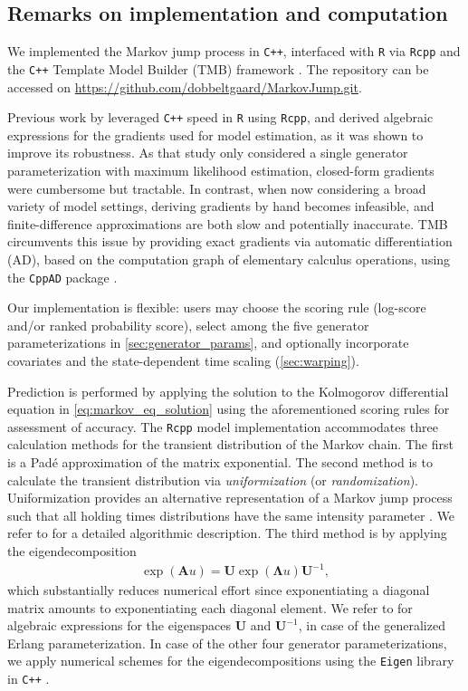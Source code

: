 \subsection{Remarks on implementation and computation} \label{sec:computation_remarks}
We implemented the Markov jump process in \texttt{C++}, interfaced with \texttt{R} via \texttt{Rcpp} \citep{Rcpp} and the \texttt{C++} Template Model Builder (TMB) framework \citep{TMB}.
The repository can be accessed on \url{https://github.com/dobbeltgaard/MarkovJump.git}.
 
Previous work by \citet{bisgaard2024A} leveraged \texttt{C++} speed in \texttt{R} using \texttt{Rcpp}, and derived algebraic expressions for the gradients used for model estimation, as it was shown to improve its robustness. 
As that study only considered a single generator parameterization with maximum likelihood estimation, closed-form gradients were cumbersome but tractable.
In contrast, when now considering a broad variety of model settings, deriving gradients by hand becomes infeasible, and finite-difference approximations are both slow and potentially inaccurate. TMB circumvents this issue by providing exact gradients via automatic differentiation (AD), based on the computation graph of elementary calculus operations, using the \texttt{CppAD} package \citep{CppAD}.

Our implementation is flexible: users may choose the scoring rule (log-score and/or ranked probability score), select among the five generator parameterizations in \cref{sec:generator_params}, and optionally incorporate covariates and the state-dependent time scaling (\cref{sec:warping}).
 
Prediction is performed by applying the solution to the Kolmogorov differential equation in \cref{eq:markov_eq_solution} using the aforementioned scoring rules for assessment of accuracy.
The \texttt{Rcpp} model implementation accommodates three calculation methods for the transient distribution of the Markov chain. The first is a Padé approximation of the matrix exponential. The second method is to calculate the transient distribution via \textit{uniformization} (or \textit{randomization}). Uniformization provides an alternative representation of a Markov jump process such that all holding times distributions have the same intensity parameter \citep[Section 1.3.4]{bladt_nielsen}. We refer to \citet{sherlock2021a} for a detailed algorithmic description. The third method is by applying the eigendecomposition
\begin{align*}
    \exp{\left( \bm{A}u \right) } = \bm{U}  \exp{\left( \bm{\Lambda}u \right) } \bm{U}^{-1}, 
\end{align*}
which substantially reduces numerical effort since exponentiating a diagonal matrix amounts to exponentiating each diagonal element.
We refer to \citet{bisgaard2024A} for algebraic expressions for the eigenspaces $\bm{U}$ and $\bm{U}^{-1}$, in case of the generalized Erlang parameterization. In case of the other four generator parameterizations, we apply numerical schemes for the eigendecompositions using the \texttt{Eigen} library in \texttt{C++} \citep{eigenweb}.

